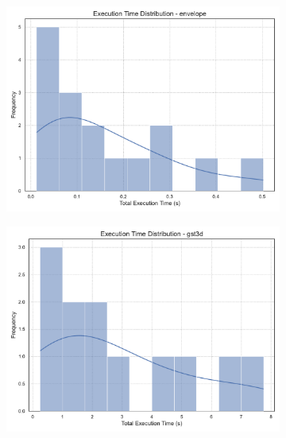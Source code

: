\begin{figure}[htbp]
    \centering
    \begin{subfigure}[t]{0.49\textwidth}
        \centering
        \includegraphics[width=\textwidth]{assets/images/05/execution_time_distribution_envelope}
    \end{subfigure}
    \hfill
    \begin{subfigure}[t]{0.49\textwidth}
        \centering
        \includegraphics[width=\textwidth]{assets/images/05/execution_time_distribution_gst3d}
    \end{subfigure}
    \hfill
    \begin{subfigure}[t]{0.49\textwidth}
        \centering

\end{subfigure}
\end{figure}
